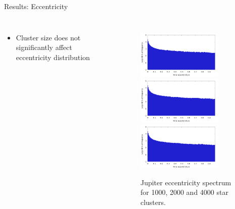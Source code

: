 \documentclass{beamer}
\begin{document}
\begin{frame}{Results: Eccentricity}
    \begin{columns}
        \begin{itemize}
            \item Cluster size does not significantly affect eccentricity distribution
        \end{itemize}
        \begin{figure}
            \caption{Jupiter eccentricity spectrum for 1000, 2000 and 4000 star clusters.}
            \includegraphics[height=0.90in]{eccentricity_jupiter_1000.png} \\
            \includegraphics[height=0.90in]{eccentricity_jupiter_2000.png} \\
            \includegraphics[height=0.90in]{eccentricity_jupiter_4000.png}
        \end{figure}
    \end{columns}
\end{frame}
\end{document}

